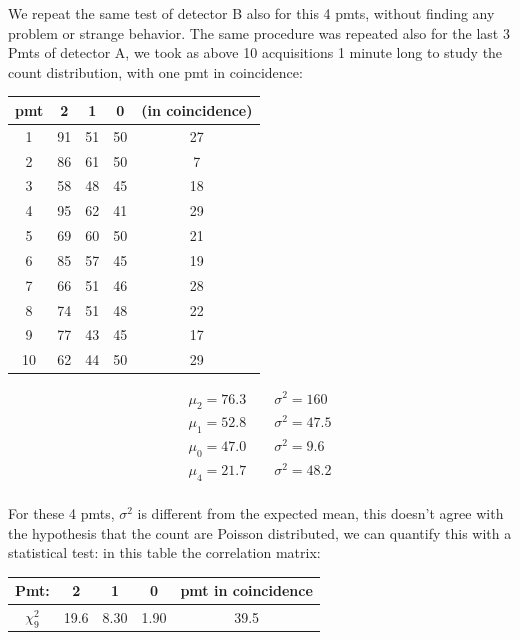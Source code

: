 We repeat the same test of detector B also for this 4 pmts, without finding any problem or strange behavior. The same procedure was repeated also for the last 3 Pmts of detector A, we took as above 10 acquisitions 1 minute long to study the count distribution, with one pmt in coincidence:

\begin{center}
\begin{tabular}{|c|c|c|c|c|}
\hline 
pmt & 2 & 1 & 0 & (in coincidence) \\ 
\hline 
1 & 91 & 51 & 50 & 27 \\ 
\hline 
2 & 86 & 61 & 50 & 7 \\ 
\hline 
3 & 58 & 48 & 45 & 18 \\ 
\hline 
4 & 95 & 62 & 41 & 29 \\ 
\hline 
5 & 69 & 60 & 50 & 21 \\ 
\hline 
6 & 85 & 57 & 45 & 19 \\ 
\hline 
7 & 66 & 51 & 46 & 28 \\ 
\hline 
8 & 74 & 51 & 48 & 22 \\ 
\hline 
9 & 77 & 43 & 45 & 17 \\ 
\hline 
10 & 62 & 44 & 50 & 29 \\ 
\hline 
\end{tabular} 
\end{center}

\begin{equation*}
\begin{split}
\mu_{2} = 76.3 \qquad \sigma^{2} = 160  \\
\mu_{1} = 52.8 \qquad \sigma^{2} = 47.5 \\
\mu_{0} = 47.0 \qquad \sigma^{2} = 9.6  \\
\mu_{4} = 21.7 \qquad \sigma^{2} = 48.2 \\
\end{split}
\end{equation*}

For these 4 pmts, $\sigma^{2}$ is different from the expected mean, this doesn't agree with the hypothesis that the count are Poisson distributed, we can quantify this with a statistical test: in this table the correlation matrix:

\begingroup
\setlength{\tabcolsep}{8pt} %
\renewcommand{\arraystretch}{1.2} %
\begin{center}
\begin{tabular}{|c|c|c|c|c|}
\hline 
Pmt: & 2 & 1 & 0 & pmt in coincidence \\ 
\hline
$\chi^{2}_{9}$ & 19.6 & 8.30 & 1.90 & 39.5\\ 
\hline
\end{tabular} 
\end{center}
\endgroup
\smallskip

